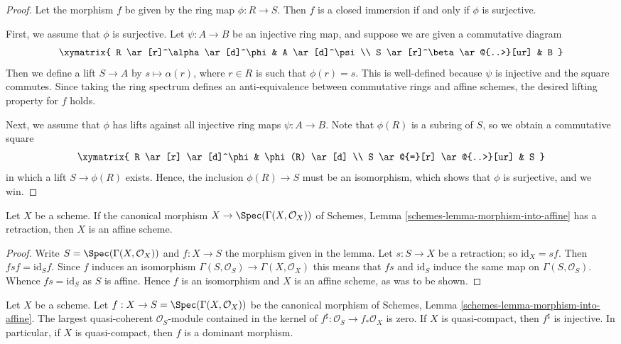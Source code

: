 \begin{proof}
Let the morphism $f$ be given by the ring map $\phi : R \to S$.
Then $f$ is a closed immersion if and only if $\phi$ is surjective.

\medskip\noindent
First, we assume that $\phi$ is surjective.
Let $\psi : A \to B$ be an injective ring map, and suppose we are given 
a commutative diagram
$$
\xymatrix{
R \ar[r]^\alpha \ar[d]^\phi & A \ar[d]^\psi \\
S \ar[r]^\beta \ar@{..>}[ur] & B
}
$$
Then we define a lift $S \to A$ by $s \mapsto \alpha(r)$, where 
$r \in R$ is such that $\phi(r) = s$. 
This is well-defined because $\psi$ is injective and the square commutes.
Since taking the ring spectrum defines an anti-equivalence between 
commutative rings and affine schemes, the desired lifting property for 
$f$ holds.

\medskip\noindent
Next, we assume that $\phi$ has lifts against all injective ring 
maps $\psi: A \to B$.
Note that $\phi(R)$ is a subring of $S$, so we obtain a commutative 
square
$$
\xymatrix{
R \ar[r] \ar[d]^\phi  & \phi(R) \ar[d] \\
S \ar@{=}[r] \ar@{..>}[ur] & S
}
$$
in which a lift $S \to \phi(R)$ exists. 
Hence, the inclusion $\phi(R) \to S$ must be an isomorphism, which 
shows that $\phi$ is surjective, and we win.
\end{proof}

\begin{lemma}
\label{lemma-scheme-affine-if-aff-is-split-mono}
Let $X$ be a scheme.
If the canonical morphism $X \to \Spec(\Gamma(X, \mathcal{O}_X))$
of Schemes, Lemma \ref{schemes-lemma-morphism-into-affine}
has a retraction, then $X$ is an affine scheme.
\end{lemma}

\begin{proof}
Write $S = \Spec(\Gamma(X, \mathcal{O}_X))$ and $f : X \to S$ the morphism
given in the lemma. Let $s : S \to X$ be a retraction; so $\text{id}_X = sf$.
Then $f s f = \text{id}_S f$. Since $f$ induces an isomorphism
$\Gamma(S, \mathcal{O}_S) \to \Gamma(X, \mathcal{O}_X)$
this means that $fs$ and $\text{id}_S$ induce the same map
on $\Gamma(S, \mathcal{O}_S)$. Whence $f s = \text{id}_S$ as $S$
is affine. Hence $f$ is an isomorphism and $X$ is an affine scheme, 
as was to be shown.
\end{proof}

\begin{lemma}
\label{lemma-aff-is-injective-on-sheaves}
Let $X$ be a scheme. Let $f : X \to S = \Spec(\Gamma(X, \mathcal{O}_X))$
be the canonical morphism of
Schemes, Lemma \ref{schemes-lemma-morphism-into-affine}.
The largest quasi-coherent $\mathcal{O}_S$-module contained
in the kernel of $f^\sharp : \mathcal{O}_S \to f_*\mathcal{O}_X$
is zero. If $X$ is quasi-compact, then $f^\sharp$ is injective.
In particular, if $X$ is quasi-compact, then $f$ is a 
dominant morphism.
\end{lemma}

